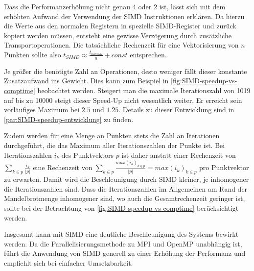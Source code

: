 Dass die Performanzerhöhung nicht genau $4$ oder $2$ ist, lässt sich mit dem erhöhten Aufwand der Verwendung
der SIMD Instruktionen erklären.
Da hierzu die Werte aus den normalen Registern in spezielle SIMD-Register und zurück
kopiert werden müssen, entsteht eine gewisse Verzögerung durch zusätzliche Transportoperationen.
Die tatsächliche Rechenzeit für eine Vektorisierung von \(n\) Punkten sollte also \(t_{SIMD} \approx \frac{t_{normal}}{n}+ const\) entsprechen.

Je größer die benötigte Zahl an Operationen, desto weniger fällt dieser konstante Zusatzaufwand ins Gewicht.
Dies kann zum Beispiel in \autoref{fig:SIMD-speedup-vs-comptime} beobachtet werden.
Steigert man die maximale Iterationszahl von 1019 auf bis zu 10000 steigt dieser Speed-Up nicht wesentlich weiter.
Er erreicht sein vorläufiges Maximum bei $2.5$ und $1.25$. Details zu dieser Entwicklung sind in \autoref{par:SIMD-speedup-entwicklung} zu finden.

Zudem werden für eine Menge an Punkten stets die Zahl an Iterationen durchgeführt,
die das Maximum aller Iterationszahlen der Punkte ist.
Bei Iterationszahlen \(i_k\) des Punktvektors \(p\) ist daher
anstatt einer Rechenzeit von \(\sum_{k \in p} \frac{i_k }{ | p | }\) eine Rechenzeit von
\(\sum_{k \in p} \frac{max(i_k)_{k \in p }}{|p|} = max(i_k)_{k \in p }\) pro Punktvektor zu erwarten.
Damit wird die Beschleunigung durch SIMD kleiner, je inhomogener die Iterationszahlen sind.
Dass die Iterationszahlen im Allgemeinen am Rand der Mandelbrotmenge inhomogener sind,
wo auch die Gesamtrechenzeit geringer ist, sollte bei der Betrachtung von \autoref{fig:SIMD-speedup-vs-comptime} berücksichtigt werden.


Insgesamt kann mit SIMD eine deutliche Beschleunigung des Systems bewirkt werden.
Da die Parallelisierungsmethode zu MPI und OpenMP unabhängig ist, führt die Anwendung von SIMD generell
zu einer Erhöhung der Performanz und empfiehlt sich bei einfacher Umsetzbarkeit.

